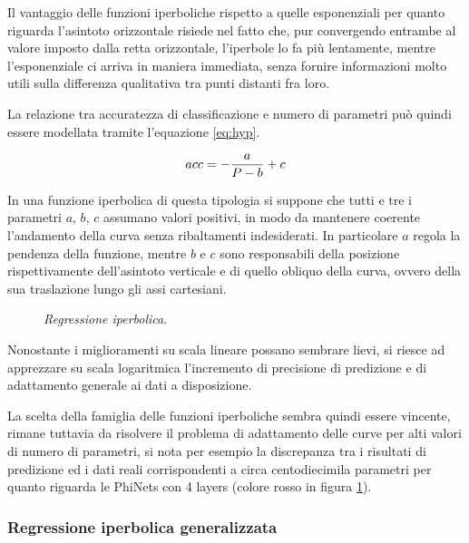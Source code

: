 Il vantaggio delle funzioni iperboliche rispetto a quelle esponenziali per quanto riguarda l'asintoto orizzontale risiede nel fatto che, pur convergendo entrambe al valore imposto dalla retta orizzontale, l'iperbole lo fa più lentamente, mentre l'esponenziale ci arriva in maniera immediata, senza fornire informazioni molto utili sulla differenza qualitativa tra punti distanti fra loro.

La relazione tra accuratezza di classificazione e numero di parametri può quindi essere modellata tramite l'equazione \ref{eq:hyp}.

\begin{equation}
\label{eq:hyp}
    \centering
    acc = -\frac{a}{P - b} + c
\end{equation}

In una funzione iperbolica di questa tipologia si suppone che tutti e tre i parametri $a$, $b$, $c$ assumano valori positivi, in modo da mantenere coerente l'andamento della curva senza ribaltamenti indesiderati. In particolare $a$ regola la pendenza della funzione, mentre $b$ e $c$ sono responsabili della posizione rispettivamente dell'asintoto verticale e di quello obliquo della curva, ovvero della sua traslazione lungo gli assi cartesiani.

\begin{figure}[ht]
    \centering
    \quad
    \quad
    \caption{\textit{Regressione iperbolica}.}
    \label{fig:hyp_reg}
\end{figure}

Nonostante i miglioramenti su scala lineare possano sembrare lievi, si riesce ad apprezzare su scala logaritmica l'incremento di precisione di predizione e di adattamento generale ai dati a disposizione. 

La scelta della famiglia delle funzioni iperboliche sembra quindi essere vincente, rimane tuttavia da risolvere il problema di adattamento delle curve per alti valori di numero di parametri, si nota per esempio la discrepanza tra i risultati di predizione ed i dati reali corrispondenti a circa centodiecimila parametri per quanto riguarda le PhiNets con 4 layers (colore rosso in figura \ref{fig:hyp_reg}).


\subsubsection{Regressione iperbolica generalizzata}

